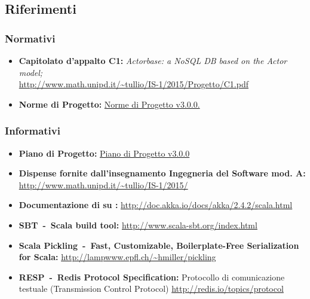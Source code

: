 \documentclass{scalatekids-article}
\begin{document}
\prodPurpose

\glossExpl

\subsection{Riferimenti}

\subsubsection{Normativi}

\begin{itemize}

\item\textbf{Capitolato d'appalto C1:} \textit{Actorbase: a NoSQL DB based on the Actor model;}\\
  \url{http://www.math.unipd.it/~tullio/IS-1/2015/Progetto/C1.pdf}
\item\textbf{Norme di Progetto:}
  \href{run:../Interni/NormeDiProgetto\_v3.0.0.pdf}{Norme di Progetto v3.0.0.}
\end{itemize}

\subsubsection{Informativi}

\begin{itemize}
\item\textbf{Piano di Progetto:}
  \href{run:./PianoDiProgetto\_v3.0.0.pdf}{Piano di Progetto v3.0.0}
\item\textbf{Dispense fornite dall'insegnamento Ingegneria del Software mod.
    A:}\\   \url{http://www.math.unipd.it/~tullio/IS-1/2015/}
\item\textbf{Documentazione di  su :}
  \url{http://doc.akka.io/docs/akka/2.4.2/scala.html}
\item\textbf{SBT\ -\ Scala build tool:}
  \url{http://www.scala-sbt.org/index.html}
\item\textbf{Scala Pickling\ -\ Fast, Customizable, Boilerplate-Free Serialization for Scala:}
  \url{http://lampwww.epfl.ch/~hmiller/pickling}
\item\textbf{RESP\ -\ Redis Protocol Specification:} Protocollo di comunicazione testuale  (Transmission Control Protocol)
  \url{http://redis.io/topics/protocol}
\end{itemize}

\newpage
\end{document}
